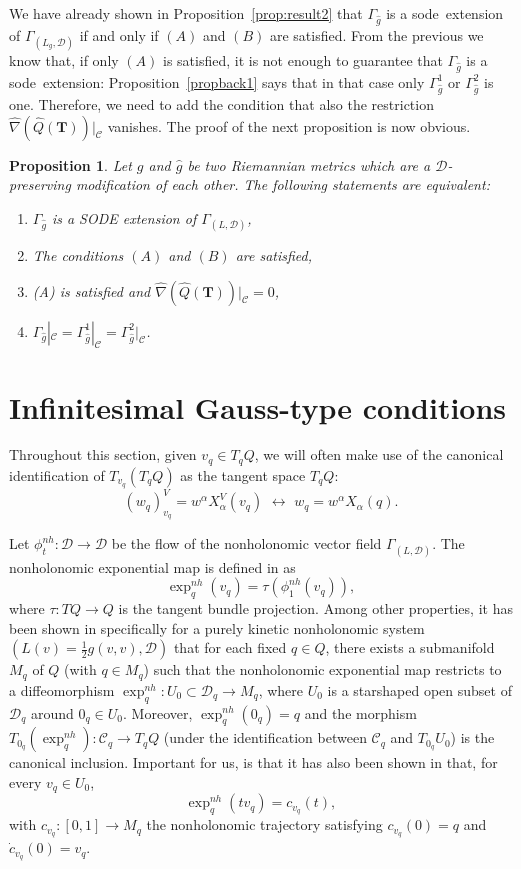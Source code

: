 \documentclass[11pt]{article}
\newtheorem{prop}{Proposition}
\def\sode{{\sc sode}}
\def\T{{\mathbf T}}
\def\D{{\mathcal D}}
\def\C{{\mathcal C}}
\def\GLD{{\Gamma_{(L,\mathcal{D})}}}
\begin{document}
We have already shown in Proposition~\ref{prop:result2}  that $\Gamma_{\hat{g}}$ is a \sode\  extension of $\Gamma_{(L_g,\mathcal{D})}$ if and only if $(A)$ and $(B)$ are satisfied. From the previous we know that, if only $(A)$ is satisfied, it is not enough to guarantee that $\Gamma_{\hat g}$ is a \sode\ extension: Proposition~\ref{propback1} says that in that case only $\Gamma_{\hat g}^1$ or $\Gamma_{\hat g}^2$ is one. Therefore, we need to add the condition that also the restriction
$\hat{\nabla}(\hat{Q}(\T))|_{\mathcal{C}}$ vanishes. The proof of the next proposition is now  obvious.

\begin{prop} \label{propback2}
Let $g$ and $\hat g$ be two Riemannian metrics which are a $\D$-preserving modification of each other.    The following statements are equivalent:
    \begin{enumerate}
\item[(i)] $\Gamma_{\hat{g}}$ is a SODE extension of $\Gamma_{(L,\mathcal{D})}$,
        \item[(ii)] The conditions $(A)$ and  $(B)$ are satisfied,
\item[(ii)] (A) is satisfied and $\hat{\nabla}(\hat{Q}(\T))|_{\mathcal{C}}=0$,
\item[(iii)] $\Gamma_{\hat{g}}|_\mathcal{C}=\Gamma_{\hat{g}}^1|_\mathcal{C} = \Gamma_{\hat{g}}^2|_\mathcal{C}$.
    \end{enumerate}
\end{prop}

\section{Infinitesimal Gauss-type conditions}\label{sec6}

Throughout this section, given $v_q\in T_qQ$, we will often make use of the canonical identification of $T_{v_q}(T_q Q)$ as the tangent space $T_q Q$: 
$$
(w_{q})_{{v_q}}^V=w^\alpha X_\alpha^V(v_q) \,\,\longleftrightarrow\,\, w_q=w^\alpha X_\alpha(q).
$$


Let $\phi_t^{nh}: \D\to\D$ be the flow of the nonholonomic vector field $\GLD$. The nonholonomic exponential map is defined in \cite{firstnonholexp} as \[
\exp^{nh}_{q}(v_q) = \tau(\phi_1^{nh}(v_q)),
\]
where $\tau:TQ\to Q$ is the tangent bundle projection.
Among other properties, it has been shown in \cite{Simoes} specifically for a purely kinetic nonholonomic system $(L(v)=\frac{1}{2}g(v,v),\D)$ that for each fixed $q\in Q$, there exists a submanifold $M_q$ of $Q$ (with $q\in M_q$) such that the nonholonomic exponential map restricts to a diffeomorphism 
$\exp^{nh}_q: U_0 \subset \D_q \to  M_q$, where $U_0$ is a starshaped
open subset of {$\D_q$} around $0_q \in U_0$.  Moreover,   $\exp^{nh}_q(0_q) = q$ and  the  morphism $T_{0_q} (\exp^{nh}_q)
: \C_q \to T_qQ$ (under the identification between $\C_q$ and $T_{0_q}U_0$) is the canonical inclusion. Important for us, is that it has also  been shown in \cite{Simoes} that, for every $v_q \in U_0$,
\[
\exp^{nh}_q (tv_q) = c_{v_q}(t),
\]
with $c_{v_q}: [0, 1] \to M_q$ the nonholonomic trajectory satisfying $c_{v_q}(0) = q$ and ${\dot c}_{v_q}
(0) = v_q$.
\end{document}

